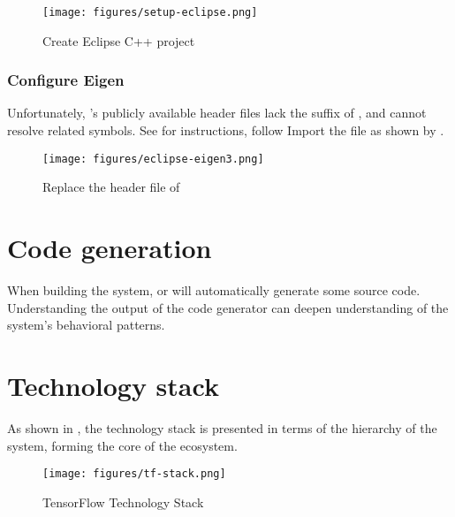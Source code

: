 \begin{content}
\begin{figure}[!htb]
  \centering
  \texttt{[image: figures/setup-eclipse.png]}
  \caption{Create Eclipse C++ project}
  \label{fig:setup-eclipse}
\end{figure}


\subsubsection{Configure Eigen}
Unfortunately, 's publicly available header files lack the suffix of , and  cannot resolve related symbols. See  for instructions, follow  Import the  file as shown by .

\begin{figure}[!htb]
  \centering
  \texttt{[image: figures/eclipse-eigen3.png]}
  \caption{Replace the header file of }
  \label{fig:eclipse-eigen3}
\end{figure}

\end{content}


\section{Code generation}
\begin{content}
When building the  system,  or  will automatically generate some source code. Understanding the output of the code generator can deepen understanding of the system's behavioral patterns.
\end{content}


\section{Technology stack}
\begin{content}
As shown in , the \tf{} technology stack is presented in terms of the hierarchy of the system, forming the core of the \tf{} ecosystem.

\begin{figure}[H]
  \centering
  \texttt{[image: figures/tf-stack.png]}
  \caption{TensorFlow Technology Stack}
  \label{fig:tf-stack}
\end{figure}

\end{content}
